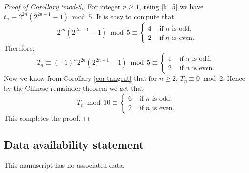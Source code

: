 \documentclass[12pt]{amsart}
\begin{document}
\begin{proof}[Proof of Corollary \ref{mod-5}]
For integer $n\geq 1$, using \eqref{k=5} we have $t_n \equiv 2^{2n}(2^{2n-1}-1) \bmod{5}$. It is easy to compute that
$$
  2^{2n}(2^{2n-1}-1) \bmod{5}\equiv
  \begin{cases}
   4   &  \text{ if  } n  \text{ is odd},\\
   2  & \text{ if } n  \text{ is even}.
  \end{cases}
  $$
Therefore,
$$
  T_n \equiv (-1)^n2^{2n}(2^{2n-1}-1) \bmod{5}\equiv
  \begin{cases}
   1   &  \text{ if  } n  \text{ is odd},\\
   2 & \text{ if } n  \text{ is even}.
  \end{cases}
  $$
Now we know from Corollary \ref{cor-tangent} that for $n \ge 2$, $T_n \equiv 0 \bmod{2}$. Hence by the Chinese remainder theorem
we get that
$$
  T_n \bmod{10}\equiv
  \begin{cases}
   6   &  \text{ if  } n  \text{ is odd},\\
   2  & \text{ if } n  \text{ is even}.
  \end{cases}
  $$
This completes the proof.
\end{proof}

\subsection*{Data availability statement}
This manuscript has no associated data.
\end{document}
